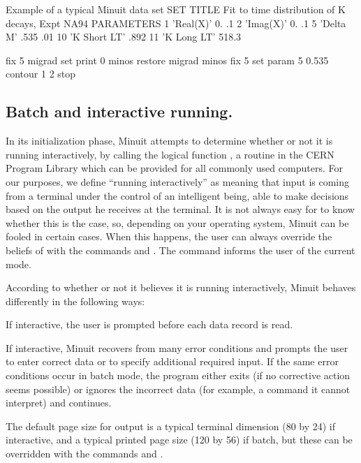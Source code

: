 \begin{XMPt}{Example of a typical Minuit data set}
SET TITLE
Fit to time distribution of K decays, Expt NA94
PARAMETERS
1 'Real(X)'  0.  .1
2 'Imag(X)'  0.  .1
5 'Delta M'  .535   .01
10 'K Short LT'  .892
11 'K Long LT'   518.3
 
fix 5
migrad
set print 0
minos
restore
migrad
minos
fix 5
set param  5   0.535
contour 1 2
stop
\end{XMPt}

\subsection{Batch and interactive running.}

In its initialization phase, Minuit attempts to determine whether
or not it is running interactively, by calling the logical function
, a routine in the CERN Program Library which can
be provided for all commonly used computers.
For our purposes, we define ``running interactively'' as meaning that
input is coming from a terminal under the control of an intelligent
being, able to make decisions based on the output he receives at
the terminal. It is not always easy for  to know whether this
is the case, so, depending on your operating system, Minuit can be
fooled in certain cases. When this happens, the user can always override
the beliefs of  with the commands  and
. 
The command  informs the user of the current mode.
 
According to whether or not it believes it is running interactively,
Minuit behaves differently in the following ways:

\begin{UL}
\item If interactive, the user is prompted before each data record is read.
\item If interactive, Minuit recovers from many error conditions
      and prompts the user to enter correct data or to specify
      additional required input.
      If the same error conditions occur in batch mode, the program either
      exits (if no corrective action seems possible) or ignores the incorrect
      data (for example, a command it cannot interpret) and continues.
\item The default page size for output is a typical terminal dimension
      (80 by 24) if interactive, and a typical printed page size (120 by 56)
      if batch, but these can be overridden with the commands 
       and .
\end{UL}

